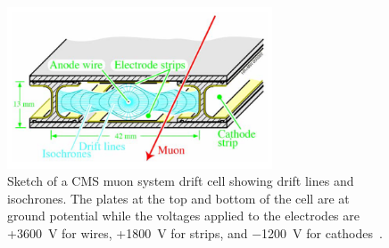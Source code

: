 \begin{figure}
\centering
\includegraphics[width=0.7\textwidth]{figures/lhc_and_cms/drift_cell}
\caption{Sketch of a CMS muon system drift cell showing drift lines and isochrones.  The plates at the top and bottom of the cell are at ground potential while the voltages applied to the electrodes are +\SI{+3600}{\V} for wires, +\SI{1800}{\V} for strips, and \SI{-1200}{\V} for cathodes~\cite{cms_experiment}.}
\label{drift_cell}
\end{figure}